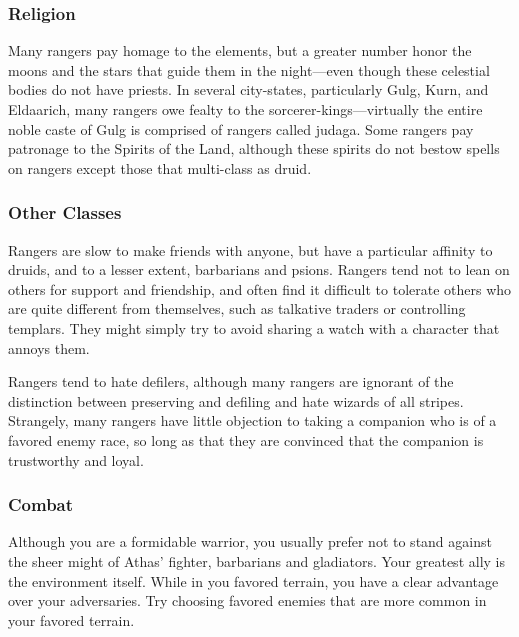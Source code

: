 \subsubsection{Religion}
Many rangers pay homage to the elements, but a greater number honor the moons and the stars that guide them in the night---even though these celestial bodies do not have priests. In several city-states, particularly Gulg, Kurn, and Eldaarich, many rangers owe fealty to the sorcerer-kings---virtually the entire noble caste of Gulg is comprised of rangers called judaga. Some rangers pay patronage to the Spirits of the Land, although these spirits do not bestow spells on rangers except those that multi-class as druid.

\subsubsection{Other Classes}
Rangers are slow to make friends with anyone, but have a particular affinity to druids, and to a lesser extent, barbarians and psions. Rangers tend not to lean on others for support and friendship, and often find it difficult to tolerate others who are quite different from themselves, such as talkative traders or controlling templars. %
They might simply try to avoid sharing a watch with a character that annoys them.

Rangers tend to hate defilers, although many rangers are ignorant of the distinction between preserving and defiling and hate wizards of all stripes. Strangely, many rangers have little objection to taking a companion who is of a favored enemy race, so long as that they are convinced that the companion is trustworthy and loyal.



\subsubsection{Combat}
Although you are a formidable warrior, you usually prefer not to stand against the sheer might of Athas' fighter, barbarians and gladiators. Your greatest ally is the environment itself. While in you favored terrain, you have a clear advantage over your adversaries. Try choosing favored enemies that are more common in your favored terrain.


